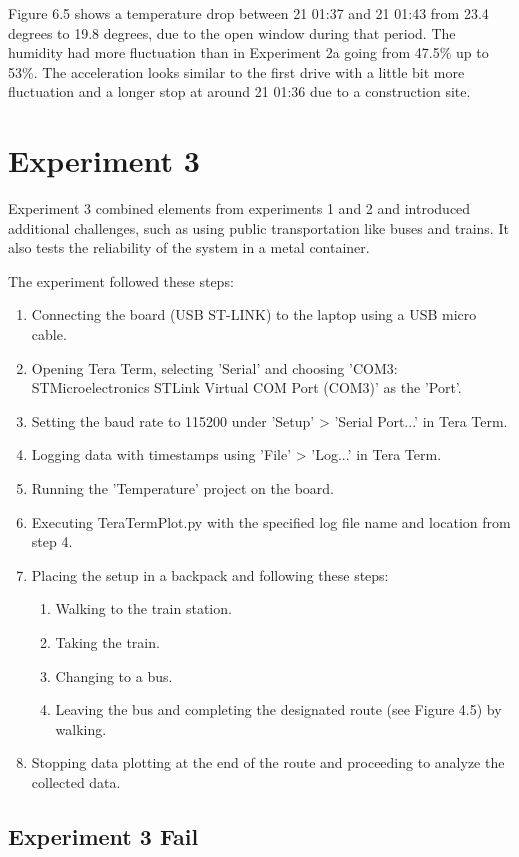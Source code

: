 Figure 6.5 shows a temperature drop between 21 01:37 and 21 01:43 from 23.4 degrees to 19.8 degrees, due to the open window during that period. The humidity had more fluctuation than in Experiment 2a going from 47.5\% up to 53\%. The acceleration looks similar to the first drive with a little bit more fluctuation and a longer stop at around 21 01:36 due to a construction site.

\section{Experiment 3}

Experiment 3 combined elements from experiments 1 and 2 and introduced additional challenges, such as using public transportation like buses and trains. It also tests the reliability of the system in a metal container.

The experiment followed these steps:

\begin{enumerate}
\item Connecting the board (USB ST-LINK) to the laptop using a USB micro cable.
\item Opening Tera Term, selecting 'Serial' and choosing 'COM3: STMicroelectronics STLink Virtual COM Port (COM3)' as the 'Port'.
\item Setting the baud rate to 115200 under 'Setup' > 'Serial Port...' in Tera Term.
\item Logging data with timestamps using 'File' > 'Log...' in Tera Term.
\item Running the 'Temperature' project on the board.
\item Executing TeraTermPlot.py with the specified log file name and location from step 4.
\item Placing the setup in a backpack and following these steps:
\begin{enumerate}
\item Walking to the train station.
\item Taking the train.
\item Changing to a bus.
\item Leaving the bus and completing the designated route (see Figure 4.5) by walking.
\end{enumerate}
\item Stopping data plotting at the end of the route and proceeding to analyze the collected data.
\end{enumerate}

\subsection{Experiment 3 Fail}

